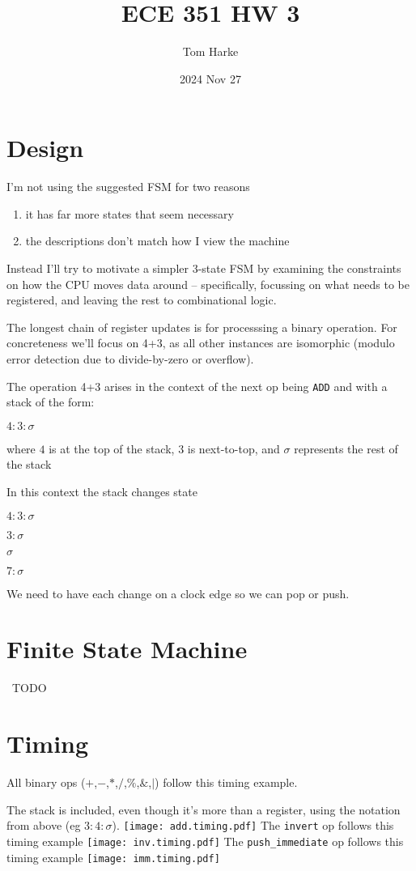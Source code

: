 \documentclass{article}
\title{ECE 351 HW 3}
\date{2024 Nov 27}
\author{Tom Harke}
\begin{document}
\maketitle

\begin{multicols}{2}

\section{Design}
I'm not using the suggested FSM for two reasons
\begin{enumerate}[noitemsep]
\item it has far more states that seem necessary
\item the descriptions don't match how I view the machine
\end{enumerate}
Instead I'll try to motivate a simpler 3-state FSM by
examining the constraints on how the CPU moves data
around -- specifically, focussing on what needs to be
registered, and leaving the rest to combinational logic.

The longest chain of register updates is for processsing
a binary operation.
For concreteness we'll focus on 4+3, as all other instances
are isomorphic (modulo error detection due
to divide-by-zero or overflow).

The operation 4+3 arises in the context of the next op being
\verb'ADD' and with a stack of the form:
\begin{center}
	$4:3:\sigma$
\end{center}
where $4$ is at the top of the stack, $3$ is next-to-top,
and $\sigma$ represents the rest of the stack

In this context the stack changes state
\begin{center} $4:3:\sigma$ \end{center}
\begin{center}   $3:\sigma$ \end{center}
\begin{center}     $\sigma$ \end{center}
\begin{center}   $7:\sigma$ \end{center}

We need to have each change on a clock edge so we can pop or push.
\section{Finite State Machine}\
TODO
\section{Timing}

All binary ops ($+$,$-$,$*$,$/$,$\%$,$\&$,$|$)
follow this timing example.

The stack is included, even though it's more than a register,
using the notation from above (eg $3:4:\sigma$).
\texttt{[image: add.timing.pdf]}
The \verb'invert' op follows this timing example
\texttt{[image: inv.timing.pdf]}
The \verb'push_immediate' op follows this timing example
\texttt{[image: imm.timing.pdf]}
\end{multicols}
\end{document}
